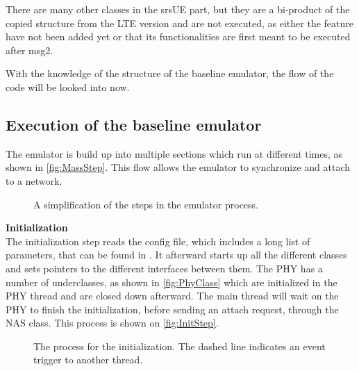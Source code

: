 There are many other classes in the srsUE part, but they are a bi-product of the copied structure from the LTE version and are not executed, as either the feature have not been added yet or that its functionalities are first meant to be executed after msg2.

With the knowledge of the structure of the baseline emulator, the flow of the code will be looked into now.

\subsection{Execution of the baseline emulator}

 The emulator is build up into multiple sections which run at different times, as shown in \autoref{fig:MassStep}. This flow allows the emulator to synchronize and attach to a network. %

\begin{figure}[H]

\centering


\resizebox{0.5\textwidth}{!}{

}

\caption{A simplification of the steps in the emulator process.}

\label{fig:MassStep}

\end{figure}

\textbf{Initialization} \\

The initialization step reads the config file, which includes a long list of parameters, that can be found in . It afterward starts up all the different classes and sets pointers to the different interfaces between them. The PHY has a number of underclasses, as shown in \autoref{fig:PhyClass} which are initialized in the PHY thread and are closed down afterward. The main thread will wait on the PHY to finish the initialization, before sending an attach request, through the NAS class. This process is shown on \autoref{fig:InitStep}.

\begin{figure}[H]

\centering


\resizebox{0.5\textwidth}{!}{

}

\caption{The process for the initialization. The dashed line indicates an event trigger to another thread.}

\label{fig:InitStep}

\end{figure}


